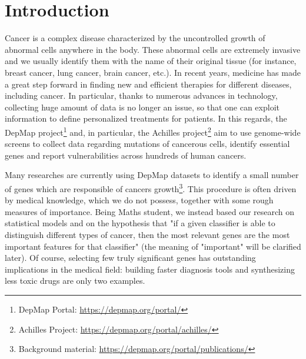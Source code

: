\documentclass[a4paper,11pt, oneside]{article}  %
\begin{document}
\section{Introduction}
Cancer is a complex disease characterized by the uncontrolled growth of abnormal cells anywhere in the body. These abnormal cells are extremely invasive and we usually identify them with the name of their original tissue (for instance, breast cancer, lung cancer,  brain cancer, etc.).  In recent years, medicine has made a great step forward in finding new and efficient therapies for different diseases, including cancer.  In particular,  thanks to numerous advances in technology,  collecting huge amount of data is no longer an issue, so that one can exploit information to define personalized treatments for patients. In this regards, the DepMap project\footnote{DepMap Portal: \url{https://depmap.org/portal/} } and,  in particular,  the Achilles project\footnote{Achilles Project: \url{https://depmap.org/portal/achilles/} } aim to use genome-wide screens to collect data regarding mutations of cancerous cells,  identify essential genes and report vulnerabilities across hundreds of human cancers. 

Many researches are currently using DepMap datasets to identify a small number of genes which are responsible of cancers growth\footnote{Background material: \url{https://depmap.org/portal/publications/}}. This procedure is often driven by medical knowledge,  which we do not possess,  together with some rough measures of importance.  Being Maths student, we instead based our research on statistical models and on the hypothesis that "if a given classifier is able to distinguish different types of cancer, then the most relevant genes are the most important features for that classifier" (the meaning of "important" will be clarified later).  Of course,  selecting few truly significant genes has outstanding implications in the medical field: building faster diagnosis tools and synthesizing less toxic drugs are only two examples. 
\end{document}
